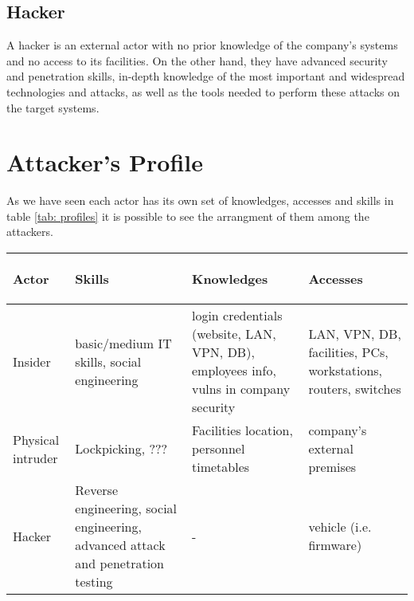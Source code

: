 \subsection*{Hacker}
A hacker is an external actor with no prior knowledge of the company's systems and no access to its facilities.
On the other hand, they have advanced security and penetration skills, in-depth knowledge of the most important and widespread technologies and attacks, as well as the tools needed to perform these attacks on the target systems.
\hfill
\hfill


\section{Attacker's Profile}
\noindent As we have seen each actor has its own set of knowledges, accesses and skills in table \ref{tab: profiles} it is possible to see the arrangment of them among the attackers.

\begin{center}
    \begin{tabular}{ | p{1.5 cm} | p{3.5cm} | p{3.5cm} | p{3.5cm} |}
    \hline
    \begin{center}
    	\textbf{Actor}
    \end{center} & 
    \begin{center}
    	\textbf{Skills}
  	\end{center} & 
    \begin{center}
    	\textbf{Knowledges}
   	\end{center} &
    \begin{center}
    	\textbf{Accesses} 
    \end{center} \\ \hline
    Insider & basic/medium IT skills, social engineering & login credentials (website, LAN, VPN, DB), employees info, vulns in company security & LAN, VPN, DB, facilities, PCs, workstations, routers, switches \\ \hline
    Physical intruder & Lockpicking, ??? & Facilities location, personnel timetables & company's external premises \\ \hline
    Hacker & Reverse engineering, social engineering, advanced attack and penetration testing & - & vehicle (i.e. firmware) \\
    \hline
 
    \end{tabular}
\end{center}

